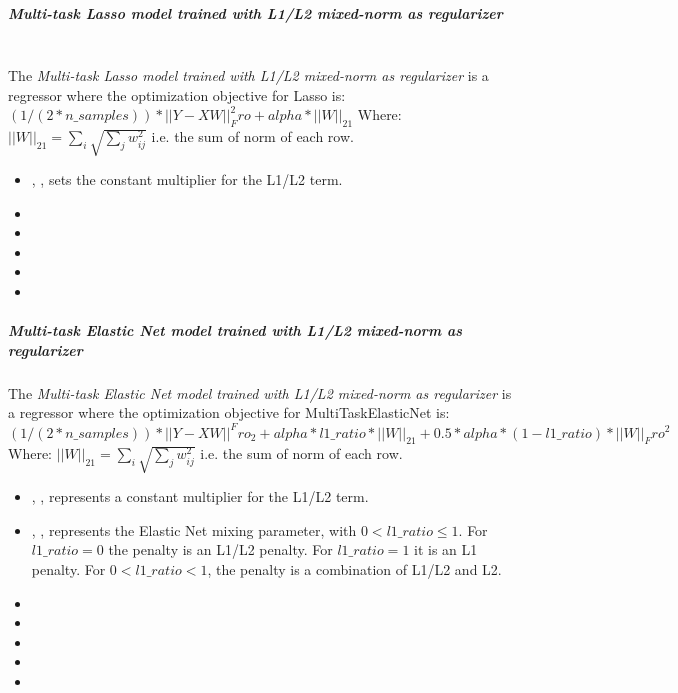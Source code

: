\subparagraph{Multi-task Lasso model trained with L1/L2 mixed-norm as
  regularizer}
\mbox{}
\\The \textit{Multi-task Lasso model trained with L1/L2 mixed-norm as
  regularizer} is a regressor where the optimization objective for Lasso is:
$(1 / (2 * n\_samples)) * ||Y - XW||^2_Fro + alpha * ||W||_21$
Where:
$||W||_21 = \sum_i \sqrt{\sum_j w_{ij}^2}$
i.e. the sum of norm of each row.
%
\begin{itemize}
  \item {}, , sets the constant
  multiplier for the L1/L2 term.
  \item {}
  \item {}
  \item \maxIterDescription{}
  \item {}
  \item \warmStartDescription{}
\end{itemize}

\subparagraph{Multi-task Elastic Net model trained with L1/L2 mixed-norm as
  regularizer}
\mbox{}

The \textit{Multi-task Elastic Net model trained with L1/L2 mixed-norm as
  regularizer} is a regressor where the optimization objective for
MultiTaskElasticNet is:
$(1 / (2 * n\_samples)) * ||Y - XW||^Fro_2
+ alpha * l1\_ratio * ||W||_21
+ 0.5 * alpha * (1 - l1\_ratio) * ||W||_Fro^2$
Where:
$||W||_21 = \sum_i \sqrt{\sum_j w_{ij}^2}$
i.e. the sum of norm of each row.
%
\begin{itemize}
  \item {}, , represents a constant
  multiplier for the L1/L2 term.
  \item {}, , represents the Elastic Net mixing
  parameter, with $0 < l1\_ratio \leq 1$.
  For $l1\_ratio = 0$ the penalty is an L1/L2 penalty.
  For $l1\_ratio = 1$ it is an L1 penalty.
  For $0 < l1\_ratio < 1$, the penalty is a combination of L1/L2
  and L2.
  \item {}
  \item {}
  \item \maxIterDescription{}
  \item {}
  \item \warmStartDescription{}
\end{itemize}

